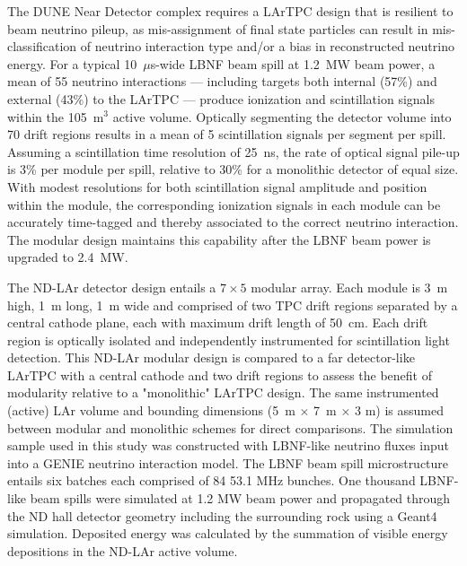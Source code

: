 The DUNE Near Detector complex requires a LArTPC design that is resilient to beam neutrino pileup, as mis-assignment of final state particles can result in mis-classification of neutrino interaction type and/or a bias in reconstructed neutrino energy. For a typical 10~$\mu$s-wide LBNF beam spill at 1.2~MW beam power, a mean of 55 neutrino interactions --- including targets both internal (57\%) and external (43\%) to the LArTPC --- produce ionization and scintillation signals within the 105~m$^3$ active volume. Optically segmenting the detector volume into 70 drift regions results in a mean of 5 scintillation signals per segment per spill. Assuming a scintillation time resolution of 25~ns, the rate of optical signal pile-up is 3\% per module per spill, relative to 30\% for a monolithic detector of equal size. With modest resolutions for both scintillation signal amplitude and position within the module, the corresponding ionization signals in each module can be accurately time-tagged and thereby associated to the correct neutrino interaction. The modular design maintains this capability after the LBNF beam power is upgraded to 2.4~MW.

The ND-LAr detector design entails a $7\times5$ modular array. Each module is 3~m high, 1~m long, 1~m wide and comprised of two TPC drift regions separated by a central cathode plane, each with maximum drift length of 50~cm. Each drift region is optically isolated and independently instrumented for scintillation light detection. This ND-LAr modular design is compared to a far detector-like LArTPC with a central cathode and two drift regions to assess the benefit of modularity relative to a "monolithic" LArTPC design. The same instrumented (active) LAr volume and bounding dimensions (5~m $\times$ 7~m $\times$ 3 m) is assumed between modular and monolithic schemes for direct comparisons. The simulation sample used in this study was constructed with LBNF-like neutrino fluxes input into a GENIE neutrino interaction model. The LBNF beam spill microstructure entails six batches each comprised of 84 53.1 MHz bunches. One thousand LBNF-like beam spills were simulated at 1.2 MW beam power and propagated through the ND hall detector geometry including the surrounding rock using a Geant4 simulation. Deposited energy was calculated by the summation of visible energy depositions in the ND-LAr active volume.

